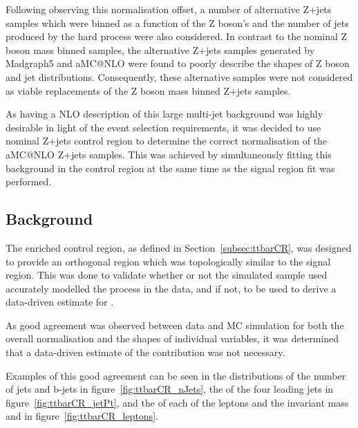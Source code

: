 Following observing this normalisation offset, a number of alternative Z+jets samples which were binned as a function of the Z boson's \pT and the number of jets produced by the hard process were also considered.
In contrast to the nominal Z boson mass binned samples, the alternative Z+jets samples generated by Madgraph5 and aMC@NLO were found to poorly describe the shapes of Z boson and jet distributions.
Consequently, these alternative samples were not considered as viable replacements of the Z boson mass binned Z+jets samples.

As having a NLO description of this large multi-jet background was highly desirable in light of the event selection requirements, it was decided to use nominal Z+jets control region to determine the correct normalisation of the aMC@NLO Z+jets samples.
This was achieved by simultaneously fitting this background in the control region at the same time as the signal region fit was performed.

\subsection{\ttbar Background}\label{subsec:ttbarEstimation}
The \ttbar enriched control region, as defined in Section~\ref{subsec:ttbarCR}, was designed to provide an orthogonal region which was topologically similar to the signal region.
This was done to validate whether or not the simulated \ttbar sample used accurately modelled the \ttbar process in the data, and if not, to be used to derive a data-driven estimate for \ttbar.

As good agreement was observed between data and MC simulation for both the overall normalisation and the shapes of individual variables, it was determined that a data-driven estimate of the \ttbar contribution was not necessary.

Examples of this good agreement can be seen in the distributions of the number of jets and b-jets in figure~\ref{fig:ttbarCR_nJets}, the \pT of the four leading jets in figure~\ref{fig:ttbarCR_jetPt}, and the \pT of each of the leptons and the invariant mass and \pT in figure~\ref{fig:ttbarCR_leptons}.

